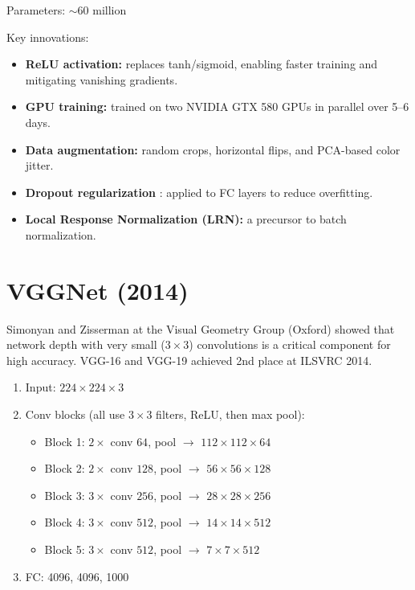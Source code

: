Parameters: $\sim$60 million

Key innovations:
\begin{itemize}
    \item \textbf{ReLU activation:} replaces tanh/sigmoid, enabling faster training and mitigating vanishing gradients.
    \item \textbf{GPU training:} trained on two NVIDIA GTX 580 GPUs in parallel over 5--6 days.
    \item \textbf{Data augmentation:} random crops, horizontal flips, and PCA-based color jitter.
    \item \textbf{Dropout regularization} \cite{srivastava2014dropout}: applied to FC layers to reduce overfitting.
    \item \textbf{Local Response Normalization (LRN):} a precursor to batch normalization.
\end{itemize}

\section{VGGNet (2014)}

Simonyan and Zisserman \cite{simonyan2014very} at the Visual Geometry Group (Oxford) showed that network depth with very small ($3\times3$) convolutions is a critical component for high accuracy. VGG-16 and VGG-19 achieved 2nd place at ILSVRC 2014.

\begin{architecture}
\begin{enumerate}
    \item Input: $224\times224\times3$
    \item Conv blocks (all use $3\times3$ filters, ReLU, then max pool):
    \begin{itemize}
        \item Block 1: $2\times$ conv $64$, pool $\rightarrow$ $112\times112\times64$
        \item Block 2: $2\times$ conv $128$, pool $\rightarrow$ $56\times56\times128$
        \item Block 3: $3\times$ conv $256$, pool $\rightarrow$ $28\times28\times256$
        \item Block 4: $3\times$ conv $512$, pool $\rightarrow$ $14\times14\times512$
        \item Block 5: $3\times$ conv $512$, pool $\rightarrow$ $7\times7\times512$
    \end{itemize}
    \item FC: 4096, 4096, 1000
\end{enumerate}
\end{architecture}


